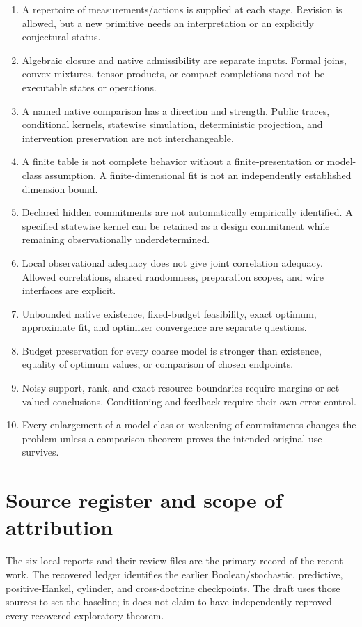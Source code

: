 \documentclass[11pt]{article}
\theoremstyle{remark}
\begin{document}
\begin{enumerate}
\item A repertoire of measurements/actions is supplied at each stage. Revision is allowed, but a new primitive needs an interpretation or an explicitly conjectural status.
\item Algebraic closure and native admissibility are separate inputs. Formal joins, convex mixtures, tensor products, or compact completions need not be executable states or operations.
\item A named native comparison has a direction and strength. Public traces, conditional kernels, statewise simulation, deterministic projection, and intervention preservation are not interchangeable.
\item A finite table is not complete behavior without a finite-presentation or model-class assumption. A finite-dimensional fit is not an independently established dimension bound.
\item Declared hidden commitments are not automatically empirically identified. A specified statewise kernel can be retained as a design commitment while remaining observationally underdetermined.
\item Local observational adequacy does not give joint correlation adequacy. Allowed correlations, shared randomness, preparation scopes, and wire interfaces are explicit.
\item Unbounded native existence, fixed-budget feasibility, exact optimum, approximate fit, and optimizer convergence are separate questions.
\item Budget preservation for every coarse model is stronger than existence, equality of optimum values, or comparison of chosen endpoints.
\item Noisy support, rank, and exact resource boundaries require margins or set-valued conclusions. Conditioning and feedback require their own error control.
\item Every enlargement of a model class or weakening of commitments changes the problem unless a comparison theorem proves the intended original use survives.
\end{enumerate}

\section{Source register and scope of attribution}
\label{app:sources}

The six local reports and their review files are the primary record of the recent work. The recovered ledger identifies the earlier Boolean/stochastic, predictive, positive-Hankel, cylinder, and cross-doctrine checkpoints. The draft uses those sources to set the baseline; it does not claim to have independently reproved every recovered exploratory theorem.
\end{document}
